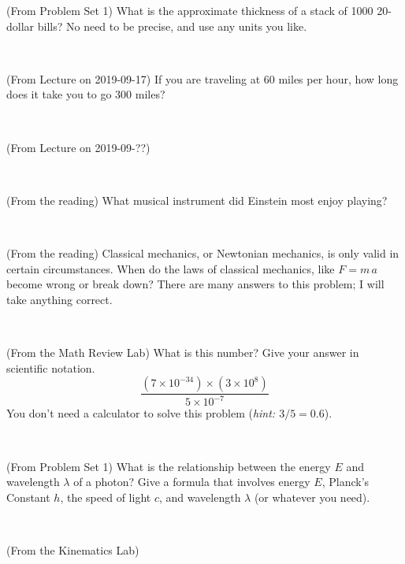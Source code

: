 \documentclass[12pt, letterpaper]{article}
\begin{document}
\begin{problem} (From Problem Set 1)
What is the approximate thickness of a stack of 1000 20-dollar bills?
No need to be precise, and use any units you like.
\end{problem}


\vfill ~

\begin{problem} (From Lecture on 2019-09-17)
If you are traveling at 60 miles per hour, how long does
it take you to go 300 miles?
\end{problem}


\vfill ~

\begin{problem} (From Lecture on 2019-09-??)
\end{problem}


\vfill ~

\begin{problem} (From the reading)
What musical instrument did Einstein most enjoy playing?
\end{problem}


\vfill ~


\clearpage


\begin{problem} (From the reading)
Classical mechanics, or Newtonian mechanics, is only valid in certain
circumstances. When do the laws of classical mechanics, like $F =
m\,a$ become wrong or break down? There are many answers to this
problem; I will take anything correct.
\end{problem}


\vfill ~

\begin{problem} (From the Math Review Lab)
What is this number? Give your answer in scientific notation.
$$
\frac{(7\times10^{-34})\times(3\times10^8)}{5\times10^{-7}}
$$
You don't need a calculator to solve this problem (\textit{hint: $3/5=0.6$}).
\end{problem}


\vfill ~

\begin{problem} (From Problem Set 1)
What is the relationship between the energy $E$ and wavelength
$\lambda$ of a photon? Give a formula that involves energy $E$,
Planck's Constant $h$, the speed of light $c$, and wavelength
$\lambda$ (or whatever you need).
\end{problem}

\vfill ~

\begin{problem} (From the Kinematics Lab)

\end{problem}
\end{document}
